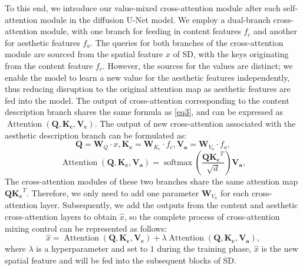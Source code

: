 To this end, we introduce our value-mixed cross-attention module after each self-attention module in the diffusion U-Net model. We employ a dual-branch cross-attention module, with one branch for feeding in content features $f_c$ and another for aesthetic features $f_a$. The queries for both branches of the cross-attention module are sourced from the spatial feature $x$ of SD, with the keys originating from the content feature $f_c$. However, the sources for the values are distinct; we enable the model to learn a new value for the aesthetic features independently, thus reducing disruption to the original attention map as aesthetic features are fed into the model. The output of cross-attention corresponding to the content description branch shares the same formula as \cref{eq3}, and can be expressed as $\operatorname{Attention}\left(\mathbf{Q}, \mathbf{K_c}, \mathbf{V_c}\right)$. The output of new cross-attention associated with the aesthetic description branch can be formulated as:
\begin{equation}
\mathbf{Q}=\mathbf{W}_{Q} \cdot x, \mathbf{K_c}=\mathbf{W}_{K_c} \cdot f_c, \mathbf{V_a}=\mathbf{W}_{V_a} \cdot f_a,\label{eq8}
\end{equation}
\begin{equation}
\operatorname{Attention}\left(\mathbf{Q}, \mathbf{K_c}, \mathbf{V_a}\right)=\operatorname{softmax}\left(\frac{\mathbf{Q} \mathbf{K_c}^T}{\sqrt{d}}\right)\mathbf{V_a},\label{eq9}
\end{equation}
The cross-attention modules of these two branches share the same attention map $\mathbf{Q} \mathbf{K_c}^T$. Therefore, we only need to add one parameter $\mathbf{W}_{V_a}$ for each cross-attention layer. Subsequently, we add the outputs from the content and aesthetic cross-attention layers to obtain $\hat{x}$, so the complete process of cross-attention mixing control can be represented as follows:
\begin{equation}
\hat{x}=\operatorname{Attention}\left(\mathbf{Q}, \mathbf{K_c}, \mathbf{V_c}\right)+\lambda\operatorname{Attention}\left(\mathbf{Q}, \mathbf{K_c}, \mathbf{V_a}\right),\label{eq10}
\end{equation}
where $\lambda$ is a hyperparameter and set to $1$ during the training phase, $\hat{x}$ is the new spatial feature and will be fed into the subsequent blocks of SD.

